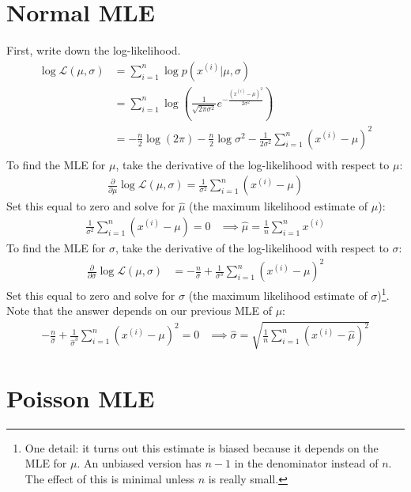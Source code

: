 \section{Normal MLE}

First, write down the log-likelihood.
\begin{align*}
\log \mathcal{L}(\mu, \sigma) &= \sum_{i=1}^n \log p(x^{(i)}|\mu, \sigma) \\
&= \sum_{i=1}^n \log \left( \frac{1}{\sqrt{2 \pi \sigma^2}} e^{-\frac{(x^{(i)}-\mu)^2}{2 \sigma^2}} \right) \\
&= -\frac{n}{2} \log (2 \pi) - \frac{n}{2} \log \sigma^2 - \frac{1}{2 \sigma^2} \sum_{i=1}^n \left( x^{(i)} - \mu \right)^2 \\
\end{align*}
To find the MLE for $\mu$, take the derivative of the log-likelihood with respect to $\mu$:
\begin{align*}
\frac{\partial}{\partial \mu} \log \mathcal{L}(\mu, \sigma) = \frac{1}{\sigma^2} \sum_{i=1}^n \left( x^{(i)} - \mu \right)
\end{align*}
Set this equal to zero and solve for $\hat{\mu}$ (the maximum likelihood estimate of $\mu$):
\begin{align*} \frac{1}{\sigma^2} \sum_{i=1}^n \left( x^{(i)} - \mu \right) = 0 & \implies \boxed{\hat{\mu} = \frac{1}{n} \sum_{i=1}^n x^{(i)}} \end{align*}
To find the MLE for $\sigma$, take the derivative of the log-likelihood with respect to $\sigma$:
\begin{align*} \frac{\partial}{\partial \sigma} \log \mathcal{L}(\mu, \sigma) &= -\frac{n}{\sigma} + \frac{1}{\sigma^3} \sum_{i=1}^n \left( x^{(i)} - \mu \right)^2
\end{align*}
Set this equal to zero and solve for $\hat{\sigma}$ (the maximum likelihood estimate of $\sigma$)\footnote{One detail: it turns out this estimate is biased because it depends on the MLE for $\mu$. An unbiased version has $n-1$ in the denominator instead of $n$. The effect of this is minimal unless $n$ is really small.}. Note that the answer depends on our previous MLE of $\mu$:
\begin{align*}
-\frac{n}{\hat{\sigma}} + \frac{1}{\hat{\sigma}^3} \sum_{i=1}^n \left( x^{(i)} - \mu \right)^2 = 0  & \implies \boxed{\hat{\sigma} = \sqrt{\frac{1}{n} \sum_{i=1}^n \left( x^{(i)} - \hat{\mu} \right)^2}}
\end{align*}

\section{Poisson MLE}

